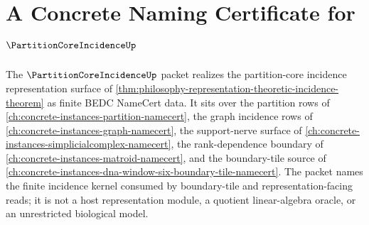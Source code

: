 \chapter{A Concrete Naming Certificate for $\PartitionCoreIncidenceUp$}
\label{ch:concrete-instances-partition-core-incidence-namecert}

The $\PartitionCoreIncidenceUp$ packet realizes the partition-core incidence representation surface of \autoref{thm:philosophy-representation-theoretic-incidence-theorem} as finite BEDC NameCert data. It sits over the partition rows of \autoref{ch:concrete-instances-partition-namecert}, the graph incidence rows of \autoref{ch:concrete-instances-graph-namecert}, the support-nerve surface of \autoref{ch:concrete-instances-simplicialcomplex-namecert}, the rank-dependence boundary of \autoref{ch:concrete-instances-matroid-namecert}, and the boundary-tile source of \autoref{ch:concrete-instances-dna-window-six-boundary-tile-namecert}. The packet names the finite incidence kernel consumed by boundary-tile and representation-facing reads; it is not a host representation module, a quotient linear-algebra oracle, or an unrestricted biological model.

